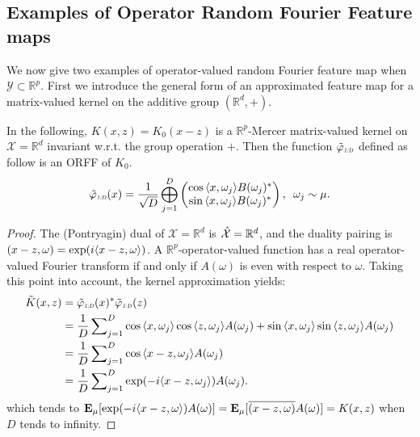 \subsection{Examples of Operator Random Fourier Feature maps}
We now give two examples of operator-valued random Fourier feature map when $\mathcal{Y}\subset\mathbb{R}^p$. First we introduce the general form of an approximated feature map for a matrix-valued kernel on the additive group $(\mathbb{R}^d,+)$.
\begin{example}\label{ex:additive_group}
In the following, $K(x,z)=K_0(x-z)$ is a $\mathbb{R}^p$-Mercer matrix-valued kernel on $\mathcal{X}=\mathbb{R}^d$ invariant w.r.t. the group operation $+$. %
Then the function $\tildePhi{1:D}$ defined as follow is an \acl{ORFF} of $K_{0}$.
\begin{equation*}
\begin{aligned}
\tildePhi{1:D}(x)=\frac{1}{\sqrt{D}}\Vect_{j=1}^D\begin{pmatrix}\cos{\inner{x,\omega_j}}B(\omega_j)^* \\ \sin{\inner{x,\omega_j}}B(\omega_j)^*\end{pmatrix}, \enskip \omega_j \sim \mu.
\end{aligned}
\end{equation*}
\end{example}
\begin{proof}
The (Pontryagin) dual of $\mathcal{X}=\mathbb{R}^d$
is $\hat{\mathcal{X}}=\mathbb{R}^d$, and the duality pairing is $(x-z,\omega)=\exp(i\langle x-z, \omega\rangle)$. A $\mathbb{R}^p$-operator-valued function has a real operator-valued Fourier transform if and only if $A(\omega)$ is even with respect to $\omega$. Taking this point into account, the kernel approximation yields:
\begin{equation*}
\begin{aligned}
\tilde{K}(x,z)&=\tildePhi{1:D}(x)^*\tildePhi{1:D}(z) \\
&= \frac{1}{D} \sum\nolimits_{j=1}^D \cos{\inner{x,\omega_j}}\cos{\inner{z,\omega_j}} A(\omega_j) + \sin{\inner{x,\omega_j}}\sin{\inner{z,\omega_j}} A(\omega_j) \\
&= \frac{1}{D} \sum\nolimits_{j=1}^D \cos{\inner{x-z,\omega_j}}A(\omega_j) \\
&= \frac{1}{D} \sum\nolimits_{j=1}^D \exp(-i\inner{x-z, \omega_j})A(\omega_j).
\end{aligned}
\end{equation*}
which tends to ${\text{\textbf{E}}}_{\mu}[\exp(-i\langle x-z, \omega\rangle)A(\omega) ]={\text{\textbf{E}}}_{\mu}[\overline{(x-z,\omega)}A(\omega)]=K(x, z)$ when $D$ tends to infinity.
\end{proof}
